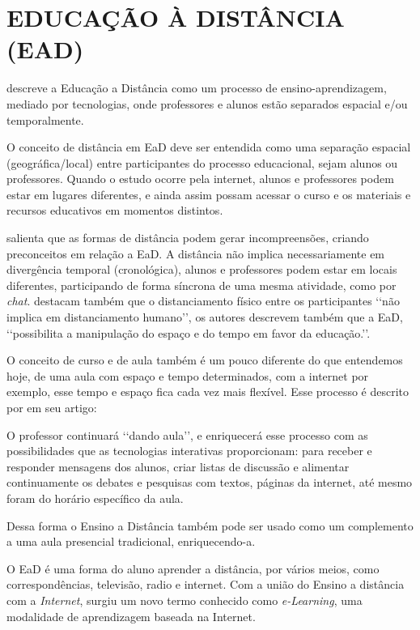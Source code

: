 \section{EDUCAÇÃO À DISTÂNCIA (EAD)}

 descreve a Educação a Distância como um processo de ensino-aprendizagem, mediado por tecnologias, onde professores e alunos estão separados espacial e/ou temporalmente.
\par
O conceito de distância em EaD deve ser entendida como uma separação espacial (geográfica/local) entre participantes do processo educacional, sejam alunos ou professores. Quando o estudo ocorre pela internet, alunos e professores podem estar em lugares diferentes, e ainda assim possam acessar o curso e os materiais e recursos educativos em momentos distintos.
\par
{} salienta que as formas de distância podem gerar incompreensões, criando preconceitos em relação a EaD. A distância não implica necessariamente em divergência temporal (cronológica), alunos e professores podem estar em locais diferentes, participando de forma síncrona de uma mesma atividade, como por \textit{chat}.   destacam também que o distanciamento físico entre os participantes \lq\lq não implica em distanciamento humano\rq\rq, os autores descrevem também que a EaD, \lq\lq possibilita a manipulação do espaço e do tempo em favor da educação.\rq\rq {}.
\par
O conceito de curso e de aula também é um pouco diferente do que entendemos hoje, de uma aula com espaço e tempo determinados, com a internet por exemplo, esse tempo e espaço fica cada vez mais flexível. Esse processo é descrito por  em seu artigo:
\begin{citacao}
  O professor continuará \lq\lq dando aula\rq\rq, e enriquecerá esse processo com as possibilidades que as tecnologias interativas proporcionam: para receber e responder mensagens dos alunos, criar listas de discussão e alimentar continuamente os debates e pesquisas com textos, páginas da internet, até mesmo foram do horário específico da aula.
\end{citacao}
\par
Dessa forma o Ensino a Distância também pode ser usado como um complemento a uma aula presencial tradicional, enriquecendo-a.
\par
O EaD é uma forma do aluno aprender a distância, por vários meios, como correspondências, televisão, radio e internet. Com a união do Ensino a distância com a \textit{Internet}, surgiu um novo termo conhecido como \textit{e-Learning}, uma modalidade de aprendizagem baseada na Internet.

